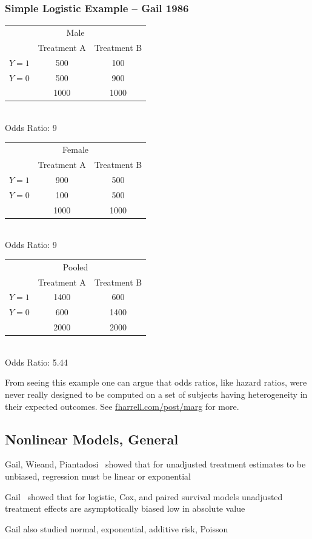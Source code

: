 \subsubsection{Simple Logistic Example -- Gail 1986}
\newcommand{\subtab}[8]{\begin{center}\begin{tabular}{l|c|c|}
    \multicolumn{3}{c}{#1} \\
    & Treatment A   & Treatment B \\ \hline
    $Y=1$ & #2 & #3 \\ \hline
    $Y=0$ & #4 & #5 \\ \hline
          & #7 & #8 \\
    \end{tabular}
    \\ Odds Ratio: #6
    \end{center}}
\subtab{Male}{500}{100}{500}{900}{9}{1000}{1000}
\subtab{Female}{900}{500}{100}{500}{9}{1000}{1000}
\subtab{Pooled}{1400}{600}{600}{1400}{5.44}{2000}{2000}

From seeing this example one can argue that odds ratios, like hazard
ratios, were never really designed to be computed on a set of subjects
having heterogeneity in their expected outcomes.  See
\href{https://www.fharrell.com/post/marg}{fharrell.com/post/marg} for more.

\subsection{Nonlinear Models, General}
\bi
\item   Gail, Wieand, Piantadosi~\cite{gai84bia} showed that for unadjusted treatment estimates to be unbiased, regression must be linear or exponential
\item   Gail~\cite{gai86adj} showed that for logistic, Cox, and paired survival models unadjusted treatment effects are asymptotically biased low in absolute value
\item   Gail also studied normal, exponential, additive risk, Poisson
\ei
{}


